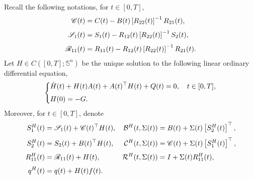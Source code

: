 \documentclass[11pt,times,twoside]{article}
\def\dbS{\mathbb{S}} \def\sS{\mathscr{S}} \def\fS{\mathfrak{S}} \def\cS{{\cal S}} \def\BS{{\bf S}} \def\Bs{{\bf s}}
\def\ms{\medskip}         \def\da{\mathop{\downarrow}}       \def\rt{\right}
\def\ba{\begin{aligned}}              \def\ea{\end{aligned}}
\begin{document}
\ms

Recall the following notations, for $t\in[0,T]$,
%
\begin{align*}
\ds \mathscr{C}(t) &=C(t)-B(t)\left[R_{22}(t)\right]^{-1} R_{21}(t), \\
\ns\ds \mathscr{S}_{1}(t) &=S_{1}(t)-R_{12}(t)\left[R_{22}(t)\right]^{-1} S_{2}(t), \\
\ns\ds \mathscr{R}_{11}(t) &=R_{11}(t)-R_{12}(t)\left[R_{22}(t)\right]^{-1} R_{21}(t).
\end{align*}
%
Let $H\in C([0,T];\dbS^n)$ be the unique solution to the following linear ordinary differential equation,
%
%
\begin{equation*}\left\{\ba
\ds & \dot{H}(t)+H(t) A(t)+A(t)^{\top} H(t)+Q(t)=0, \q t\in[0, T], \\
\ns\ds & H(0)=-G.
\ea\right.\end{equation*}
%
Moreover, for $t\in[0,T]$, denote
%
\begin{align*}
\ds S_{1}^{H}(t) &=\mathscr{S}_{1}(t)+\mathscr{C}(t)^{\top} H(t),
& \mathcal{B}^{H}(t, \Si(t)) &=B(t)+\Si(t)\lt[S_{2}^{H}(t)\rt]^{\top}, \\
%
\ns\ds S_{2}^{H}(t) &=S_{2}(t)+B(t)^{\top} H(t), & \mathcal{C}^{H}(t, \Si(t)) &=\mathscr{C}(t)+\Si(t)\left[S_{1}^{H}(t)\right]^{\top}, \\
%
\ns\ds R_{11}^{H}(t) &=\mathscr{R}_{11}(t)+H(t), & \mathcal{R}^{H}(t, \Si(t)) &=I+\Si(t) R_{11}^{H}(t),\\
%
\ns\ds q^H(t) &=q(t) +H(t)f(t).
%
\end{align*}
\end{document}
